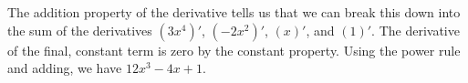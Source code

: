 The addition property of the derivative tells us that we
can break this down into the sum of the derivatives
$(3x^4)'$, $(-2x^2)'$, $(x)'$, and $(1)'$.
The derivative of the final, constant term is zero by the constant property.
Using the power rule and adding, we have
$12x^3-4x+1$.
